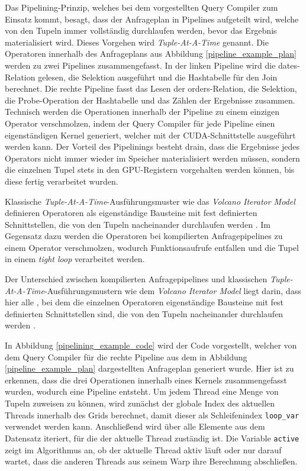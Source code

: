 Das Pipelining-Prinzip, welches bei dem vorgestellten Query Compiler zum Einsatz kommt, besagt, dass der Anfrageplan in Pipelines aufgeteilt wird, welche von den Tupeln immer vollständig durchlaufen werden, bevor das Ergebnis materialisiert wird.
Dieses Vorgehen wird \emph{Tuple-At-A-Time} genannt.
Die Operatoren innerhalb des Anfrageplans aus Abbildung \ref{pipeline_example_plan} werden zu zwei Pipelines zusammengefasst.
In der linken Pipeline wird die \textsf{dates}-Relation gelesen, die Selektion ausgeführt und die Hashtabelle für den Join berechnet.
Die rechte Pipeline fasst das Lesen der \textsf{orders}-Relation, die Selektion, die Probe-Operation der Hashtabelle und das Zählen der Ergebnisse zusammen.
Technisch werden die Operationen innerhalb der Pipeline zu einem einzigen Operator verschmolzen, indem der Query Compiler für jede Pipeline einen eigenständigen Kernel generiert, welcher mit der CUDA-Schnittstelle ausgeführt werden kann.
Der Vorteil des Pipelinings besteht drain, dass die Ergebnisse jedes Operators nicht immer wieder im Speicher materialisiert werden müssen, sondern die einzelnen Tupel stets in den GPU-Registern vorgehalten werden können, bis diese fertig verarbeitet wurden.

Klassische \emph{Tuple-At-A-Time}-Ausführungsmuster wie das \emph{Volcano Iterator Model} definieren Operatoren als eigenständige Bausteine mit fest definierten Schnittstellen, die von den Tupeln nacheinander durchlaufen werden \cite{Graefe1994}.
Im Gegensatz dazu werden die Operatoren bei kompilierten Anfragepipelines zu einem Operator verschmolzen, wodurch Funktionsaufrufe entfallen und die Tupel in einem \emph{tight loop} \cite{Neumann2011} verarbeitet werden.

Der Unterschied zwischen kompilierten Anfragepipelines und klassischen \emph{Tuple-At-A-Time}-Ausführungsmustern wie dem \emph{Volcano Iterator Model} liegt darin, dass hier alle , bei dem die einzelnen Operatoren eigenständige Bausteine mit fest definierten Schnittstellen sind, die von den Tupeln nacheinander durchlaufen werden \cite{Graefe1994}.

In Abbildung \ref{pipelining_example_code} wird der Code vorgestellt, welcher von dem Query Compiler für die rechte Pipeline aus dem in Abbildung \ref{pipeline_example_plan} dargestellten Anfrageplan generiert wurde.
Hier ist zu erkennen, dass die drei Operationen innerhalb eines Kernels zusammengefasst wurden, wodurch eine Pipeline entsteht.
Um jedem Thread eine Menge von Tupeln zuweisen zu können, wird zunächst der globale Index des aktuellen Threads innerhalb des Grids berechnet, damit dieser als Schleifenindex \texttt{loop\_var} verwendet werden kann.
Anschließend wird über alle Elemente aus dem Datensatz iteriert, für die der aktuelle Thread zuständig ist.
Die Variable \texttt{active} zeigt im Algorithmus an, ob der aktuelle Thread aktiv läuft oder nur darauf wartet, dass die anderen Threads aus seinem Warp ihre Berechnung abschließen.

